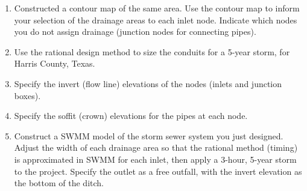 \documentclass[12pt]{article}
\begin{document}
\begin{enumerate}
\item Constructed a contour map of the same area. Use the contour map to inform your selection of the drainage areas to each inlet node. Indicate which nodes you do not assign drainage (junction nodes for connecting pipes).
\item Use the rational design method to size the conduits for a 5-year storm, for Harris County, Texas.
\item Specify the invert (flow line) elevations of the nodes (inlets and junction boxes).
\item Specify the soffit (crown) elevations for the pipes at each node.
\item Construct a SWMM model of the storm sewer system you just designed.   
Adjust the width of each drainage area so that the rational method (timing) is approximated in SWMM for each inlet, then apply a 3-hour, 5-year storm to the project.  
Specify the outlet as a free outfall, with the invert elevation as the bottom of the ditch.
\end{enumerate}















 
\end{document}
